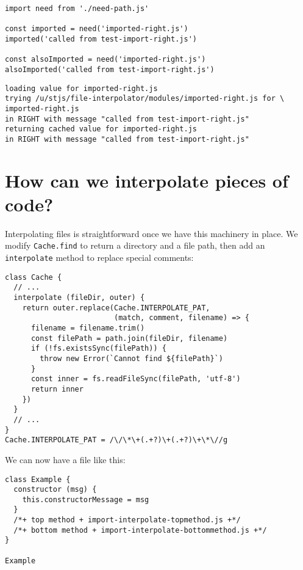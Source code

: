 \documentclass[krantzl]{krantz}
\begin{document}
\begin{lstlisting}[frame=tblr]
import need from './need-path.js'

const imported = need('imported-right.js')
imported('called from test-import-right.js')

const alsoImported = need('imported-right.js')
alsoImported('called from test-import-right.js')
\end{lstlisting}



\begin{lstlisting}[frame=tblr,backgroundcolor=\color{black!5}]
loading value for imported-right.js
trying /u/stjs/file-interpolator/modules/imported-right.js for \
imported-right.js
in RIGHT with message "called from test-import-right.js"
returning cached value for imported-right.js
in RIGHT with message "called from test-import-right.js"
\end{lstlisting}


\section{How can we interpolate pieces of code?}\label{file-interpolator-interpolate}


Interpolating files is straightforward once we have this machinery in place.
We modify \texttt{Cache.find} to return a directory and a file path,
then add an \texttt{interpolate} method to replace special comments:


\begin{lstlisting}[frame=tblr]
class Cache {
  // ...
  interpolate (fileDir, outer) {
    return outer.replace(Cache.INTERPOLATE_PAT,
                         (match, comment, filename) => {
      filename = filename.trim()
      const filePath = path.join(fileDir, filename)
      if (!fs.existsSync(filePath)) {
        throw new Error(`Cannot find ${filePath}`)
      }
      const inner = fs.readFileSync(filePath, 'utf-8')
      return inner
    })
  }
  // ...
}
Cache.INTERPOLATE_PAT = /\/\*\+(.+?)\+(.+?)\+\*\//g
\end{lstlisting}



We can now have a file like this:


\begin{lstlisting}[frame=tblr]
class Example {
  constructor (msg) {
    this.constructorMessage = msg
  }
  /*+ top method + import-interpolate-topmethod.js +*/
  /*+ bottom method + import-interpolate-bottommethod.js +*/
}

Example
\end{lstlisting}
\end{document}
